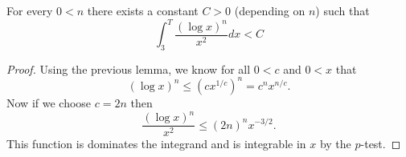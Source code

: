 \begin{lemma}
\label{log_pow_over_xsq_integral_bounded}
\leanok
For every $0<n$ there exists a constant $C>0$ (depending on $n$) such that
  $$
  \int_3^T\frac{(\log x)^n}{x^2}dx < C
  $$
\end{lemma}
\begin{proof}
\leanok
Using the previous lemma, we know for all $0<c$ and $0<x$ that
  $$(\log x)^n\leq (cx^{1/c})^n=c^nx^{n/c}.$$
  Now if we choose $c=2n$ then
  $$\frac{(\log x)^n}{x^2}\leq (2n)^nx^{-3/2}.$$
  This function is dominates the integrand and is integrable in $x$ by the $p$-test.
\end{proof}
